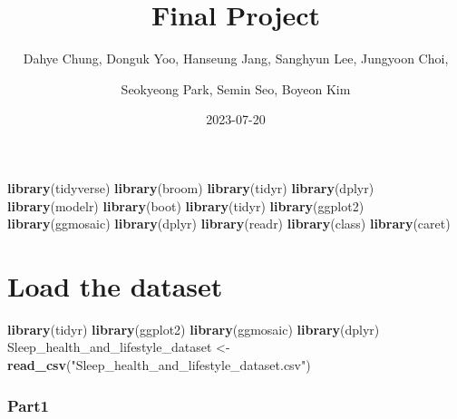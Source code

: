 \documentclass[
  11pt,
]{article}
\title{Final Project}
\author{Dahye Chung, Donguk Yoo, Hanseung Jang, Sanghyun Lee, Jungyoon
Choi, \and Seokyeong Park, Semin Seo, Boyeon Kim}
\date{2023-07-20}
\newenvironment{Shaded}{\begin{snugshade}}{\end{snugshade}}
\newcommand{\FunctionTok}[1]{\textcolor[rgb]{0.13,0.29,0.53}{\textbf{#1}}}
\newcommand{\NormalTok}[1]{#1}
\newcommand{\OtherTok}[1]{\textcolor[rgb]{0.56,0.35,0.01}{#1}}
\newcommand{\StringTok}[1]{\textcolor[rgb]{0.31,0.60,0.02}{#1}}
\begin{document}
\maketitle

\begin{Shaded}
\begin{Highlighting}[]
\FunctionTok{library}\NormalTok{(tidyverse)}
\FunctionTok{library}\NormalTok{(broom)}
\FunctionTok{library}\NormalTok{(tidyr)}
\FunctionTok{library}\NormalTok{(dplyr)}
\FunctionTok{library}\NormalTok{(modelr)}
\FunctionTok{library}\NormalTok{(boot)}
\FunctionTok{library}\NormalTok{(tidyr)}
\FunctionTok{library}\NormalTok{(ggplot2)}
\FunctionTok{library}\NormalTok{(ggmosaic)}
\FunctionTok{library}\NormalTok{(dplyr)}
\FunctionTok{library}\NormalTok{(readr)}
\FunctionTok{library}\NormalTok{(class)}
\FunctionTok{library}\NormalTok{(caret)}
\end{Highlighting}
\end{Shaded}

\hypertarget{load-the-dataset}{%
\section{Load the dataset}\label{load-the-dataset}}

\begin{Shaded}
\begin{Highlighting}[]
\FunctionTok{library}\NormalTok{(tidyr)}
\FunctionTok{library}\NormalTok{(ggplot2)}
\FunctionTok{library}\NormalTok{(ggmosaic)}
\FunctionTok{library}\NormalTok{(dplyr)}
\NormalTok{Sleep\_health\_and\_lifestyle\_dataset }\OtherTok{\textless{}{-}} \FunctionTok{read\_csv}\NormalTok{(}\StringTok{"Sleep\_health\_and\_lifestyle\_dataset.csv"}\NormalTok{)}
\end{Highlighting}
\end{Shaded}

\hypertarget{part1}{%
\subsubsection{Part1}\label{part1}}
\end{document}
